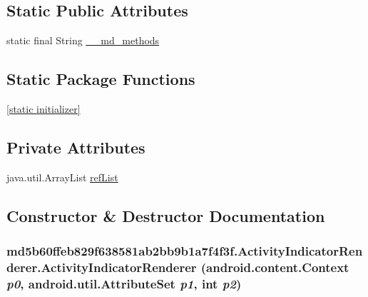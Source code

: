 \subsection*{Static Public Attributes}
\begin{CompactItemize}
\item 
static final String \hyperlink{classmd5b60ffeb829f638581ab2bb9b1a7f4f3f_1_1_activity_indicator_renderer_b234fd2d3a2a9112481b6ec6f5f98c1d}{\_\-\_\-md\_\-methods}
\end{CompactItemize}
\subsection*{Static Package Functions}
\begin{CompactItemize}
\item 
\hyperlink{classmd5b60ffeb829f638581ab2bb9b1a7f4f3f_1_1_activity_indicator_renderer_ed6f0fb925a7f5d4ef808b3016a59e91}{\mbox{[}static initializer\mbox{]}}
\end{CompactItemize}
\subsection*{Private Attributes}
\begin{CompactItemize}
\item 
java.util.ArrayList \hyperlink{classmd5b60ffeb829f638581ab2bb9b1a7f4f3f_1_1_activity_indicator_renderer_d465ebc26140c383de6a0a2f34b1deb4}{refList}
\end{CompactItemize}


\subsection{Constructor \& Destructor Documentation}
\hypertarget{classmd5b60ffeb829f638581ab2bb9b1a7f4f3f_1_1_activity_indicator_renderer_b2883ac0bdf26e5fa667b0c58010f930}{
\subsubsection[{ActivityIndicatorRenderer}]{\setlength{\rightskip}{0pt plus 5cm}md5b60ffeb829f638581ab2bb9b1a7f4f3f.ActivityIndicatorRenderer.ActivityIndicatorRenderer (android.content.Context {\em p0}, \/  android.util.AttributeSet {\em p1}, \/  int {\em p2})}}
\label{classmd5b60ffeb829f638581ab2bb9b1a7f4f3f_1_1_activity_indicator_renderer_b2883ac0bdf26e5fa667b0c58010f930}


